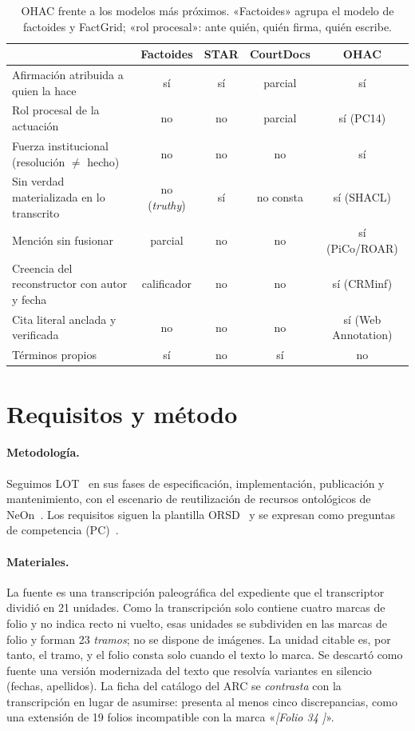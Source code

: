 \documentclass[runningheads]{llncs}
\newcommand{\ttt}[1]{\texttt{\small #1}}
\newcommand{\cita}[1]{«\textit{#1}»}
\newcommand{\tablafuente}{\footnotesize\renewcommand{\ttt}[1]{\texttt{##1}}\renewcommand{\arraystretch}{1.12}}
\begin{document}
\begin{table}[tb]
\centering
\caption{OHAC frente a los modelos más próximos. «Factoides» agrupa el modelo de factoides y FactGrid; «rol procesal»: ante quién, quién firma, quién escribe.}\label{tab:comparacion}
\tablafuente
\begin{tabularx}{\linewidth}{@{}Lcccc@{}}
\toprule
 & Factoides & STAR & CourtDocs & OHAC \\
\midrule
Afirmación atribuida a quien la hace & sí & sí & parcial & sí \\
Rol procesal de la actuación & no & no & parcial & sí (PC14) \\
Fuerza institucional (resolución $\neq$ hecho) & no & no & no & sí \\
Sin verdad materializada en lo transcrito & no (\emph{truthy}) & sí & no consta & sí (SHACL) \\
Mención sin fusionar & parcial & no & no & sí (PiCo/ROAR) \\
Creencia del reconstructor con autor y fecha & calificador & no & no & sí (CRMinf) \\
Cita literal anclada y verificada & no & no & no & sí (Web Annotation) \\
Términos propios & sí & no & sí & no \\
\bottomrule
\end{tabularx}
\end{table}

\section{Requisitos y método}\label{sec:requisitos}

\paragraph{Metodología.}
Seguimos LOT~\cite{poveda2022lot} en sus fases de especificación, implementación, publicación y mantenimiento, con
el escenario de reutilización de recursos ontológicos de NeOn~\cite{suarez2015neon}. Los requisitos siguen la
plantilla ORSD~\cite{suarez2009orsd} y se expresan como preguntas de competencia (PC)~\cite{gruninger1995,ren2014cq}.

\paragraph{Materiales.}
La fuente es una transcripción paleográfica del expediente que el transcriptor dividió en 21 unidades. Como la
transcripción solo contiene cuatro marcas de folio y no indica recto ni vuelto, esas unidades se subdividen en las
marcas de folio y forman 23 \emph{tramos}; no se dispone de imágenes. La unidad citable es, por tanto, el tramo, y el
folio consta solo cuando el texto lo marca. Se descartó como fuente una versión modernizada del texto que resolvía
variantes en silencio (fechas, apellidos). La ficha del catálogo del ARC se \emph{contrasta} con la transcripción en
lugar de asumirse: presenta al menos cinco discrepancias, como una extensión de 19 folios incompatible con la marca
\cita{[Folio 34 ]}.
\end{document}
